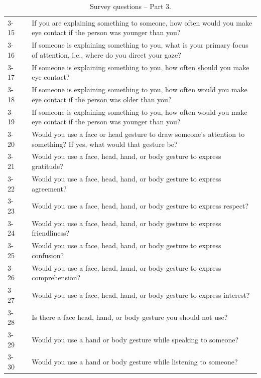 \documentclass{CSSRforAfrica}
\begin{document}
\begin{table}[thb]
\begin{center}
\begin{tabularx}{\linewidth}{|l c|X|}
 {\small 3-15}  & {\small} & {\small If you are explaining something to someone, how often would you make eye contact if the person was younger than you?}\\
 {\small 3-16}  & {\small} & {\small If someone is explaining something to you, what is your primary focus of attention, i.e., where do you direct your gaze?}\\
 {\small 3-17} & {\small}  & {\small If someone is explaining something to  you,  how often should you make eye contact?}\\
 {\small 3-18} & {\small}  & {\small If someone is explaining something to  you,  how often would you make eye contact if the person was older than you?}\\
 {\small 3-19}  & {\small} & {\small If someone is explaining something to you,  how often would you make eye contact if the person was younger than you?}\\	
 {\small 3-20}  & {\small} & {\small Would you use a face or head gesture to draw someone's attention  to something? If yes, what would that gesture be? }\\
 {\small 3-21}  & {\small} & {\small Would you use a face, head, hand, or body gesture to express gratitude?}\\
 {\small 3-22 } & {\small}  & {\small Would you use a face,  head, hand, or body gesture to express agreement?}\\
 {\small 3-23 }  & {\small} & {\small Would you use a face,  head, hand, or body gesture to express  respect?}\\
 {\small 3-24 }  & {\small} & {\small Would you use a face,  head, hand, or body gesture to express friendliness?}\\
 {\small 3-25 } & {\small}  & {\small Would you use a face,  head, hand, or body gesture to express  confusion?}\\
 {\small 3-26 } & {\small}  & {\small Would you use a face,  head, hand, or body gesture to express comprehension? }\\
 {\small 3-27 }  & {\small} & {\small Would you use a face,  head, hand, or body gesture to express interest?}\\
 {\small 3-28 }  & {\small } & {\small Is there  a face head, hand, or body gesture you should not use?}\\
 {\small 3-29 }  & {\small} & {\small Would you use a hand or body gesture while speaking to someone? }\\
 {\small 3-30 }  & {\small} & {\small Would you use a hand or body gesture while listening to someone?}\\
\hline \hline
\end{tabularx}
\end{center}
\caption{Survey questions -- Part 3. }
\label{table:questions3}
\end{table}
\end{document}
